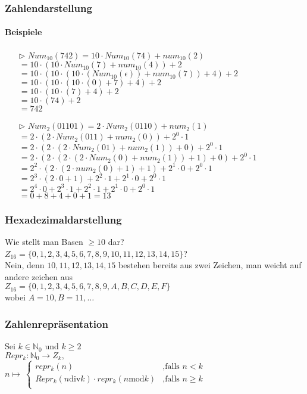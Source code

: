 \documentclass{beamer}
\begin{document}
	\begin{frame}
		\frametitle{Zahlendarstellung}
		\framesubtitle{Beispiele}
		\begin{enumerate}
			\item[$\triangleright$] $Num_{10}(742)=10\cdot Num_{10}(74)+num_{10}(2)$\\
				$=10\cdot(10\cdot Num_{10}(7)+num_{10}(4))+2$\\
				$=10\cdot(10\cdot(10\cdot (Num_{10}(\epsilon))+num_{10}(7))+4)+2$\\%
				$=10\cdot(10\cdot(10\cdot (0)+7)+4)+2$\\
				$=10\cdot(10\cdot(7)+4)+2$\\
				$=10\cdot(74)+2$\\
				$=742$\\
			\item[$\triangleright$] $Num_{2}(01101)=2\cdot Num_{2}(0110)+num_{2}(1)$\\
				$=2\cdot(2\cdot Num_{2}(011)+num_{2}(0))+2^{0}\cdot1$\\
				$=2\cdot(2\cdot (2\cdot Num_{2}(01)+num_{2}(1))+0)+2^{0}\cdot1$\\
				$=2\cdot(2\cdot (2\cdot (2\cdot Num_{2}(0)+num_{2}(1))+1)+0)+2^{0}\cdot1$\\
				$=2^{2}\cdot (2\cdot (2\cdot num_{2}(0)+1)+1)+2^{1}\cdot0+2^{0}\cdot1$\\
				$=2^{3}\cdot (2\cdot 0+1)+2^{2}\cdot1+2^{1}\cdot0+2^{0}\cdot1$\\
				$=2^{4}\cdot 0+2^{3}\cdot 1+2^{2}\cdot1+2^{1}\cdot0+2^{0}\cdot1$\\
				$=0+8+4+0+1=13$
		\end{enumerate}
	\end{frame}
	\begin{frame}
		\frametitle{Hexadezimaldarstellung}
		Wie stellt man Basen $\geq10$ dar?\\
		$Z_{16}=\{0,1,2,3,4,5,6,7,8,9,10,11,12,13,14,15\}$?\\
		Nein, denn $10,11,12,13,14,15$ bestehen bereits aus zwei Zeichen, man weicht auf andere zeichen aus\\
		$Z_{16}=\{0,1,2,3,4,5,6,7,8,9,A,B,C,D,E,F\}$\\
		wobei $A=10,B=11,\dots$\\
	\end{frame}
	\begin{frame}
		\frametitle{Zahlenrepräsentation}
		Sei $k\in\mathbb{N}_{0}$ und $k\geq2$\\
		$Repr_{k}:\mathbb{N}_{0}\longrightarrow Z_{k},$\\
		$n\mapsto~
		\begin{cases}
			repr_{k}(n) & \text{,falls $n<k$}\\
			Repr_{k}(n\text{div}k)\cdot repr_{k}(n\text{mod}k) & \text{,falls $n\geq k$}\\
		\end{cases}$\\
		\\
	\end{frame}
\end{document}
